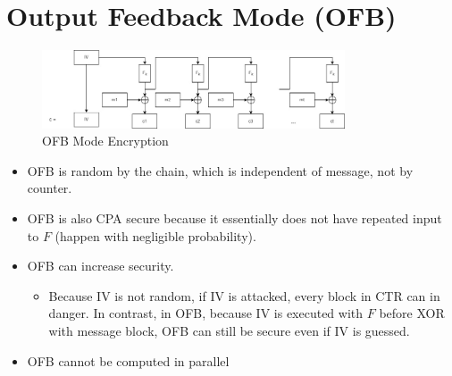 \documentclass{scribe}
\begin{document}
\section{Output Feedback Mode (OFB)}
\begin{figure}[H]
  \centering
  \includegraphics[width=0.8\textwidth]{ofb.jpg}
  \caption{OFB Mode Encryption}
\end{figure}
\begin{itemize}
    \item OFB is random by the chain, which is independent of message, not by counter.
    \item OFB is also CPA secure because it essentially does not have repeated input to $F$ (happen with negligible probability).
    \item OFB can increase security. 
    \begin{itemize}
    \item Because IV is not random, if IV is attacked, every block in CTR can in danger. In contrast, in OFB, because IV is executed with $F$ before XOR with message block, OFB can still be secure even if IV is guessed.
    \end{itemize}
    \item OFB cannot be computed in parallel
\end{itemize}

\end{document}
